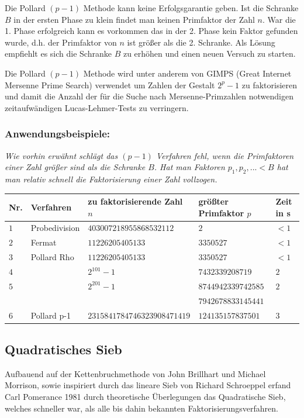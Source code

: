 \documentclass[a4paper,11pt]{article}
\begin{document}
Die Pollard $(p-1)$ Methode kann keine Erfolgsgarantie geben. Ist die Schranke $B$
in der ersten Phase zu klein findet man keinen Primfaktor der Zahl $n$. War die
1. Phase erfolgreich kann es vorkommen das in der 2. Phase kein Faktor gefunden
wurde, d.h. der Primfaktor von $n$ ist größer als die 2. Schranke. Als Lösung
empfiehlt es sich die Schranke $B$ zu erhöhen und einen neuen Versuch zu
starten.

Die Pollard $(p-1)$ Methode wird unter anderem von GIMPS (Great Internet Mersenne Prime Search) verwendet
um Zahlen der Gestalt $2^p-1$ zu faktorisieren und damit die Anzahl der für die Suche
nach Mersenne-Primzahlen notwendigen zeitaufwändigen Lucas-Lehmer-Tests zu verringern.


\subsubsection*{Anwendungsbeispiele:}
{\it
Wie vorhin erwähnt schlägt das $(p-1)$ Verfahren fehl, wenn die Primfaktoren
einer Zahl größer sind als die Schranke $B$.
Hat man Faktoren $p_1, p_2,...<B$ hat man relativ schnell die Faktorisierung einer Zahl
vollzogen.
}
\begin{center}
\begin{tabular}{|l|l|l|l|l|}
\hline
Nr. & Verfahren & zu faktorisierende Zahl $n$ & größter Primfaktor $p$ & Zeit in s\\
\hline
$1$& Probedivision & $403007218955868532112$ & $2$ & $<1$\\
\hline
$2$& Fermat & $11226205405133$ & $3350527$ & $<1$\\
\hline
$3$ & Pollard Rho & $11226205405133$ & $3350527$ & $<1$\\
$4$& & $2^{101}-1$ & $7432339208719$ & $2$\\
$5$& & $2^{201}-1$ & $8744942339742585$ & $2$\\
   & &             & $7942678833145441$ & \\
$6$ & Pollard p-1 & $2315841784746323908471419$ & $124135157837501$ & $3$\\
\hline
\end{tabular}
\end{center}


\subsection{Quadratisches Sieb}
Aufbauend auf der Kettenbruchmethode von John Brillhart und Michael Morrison,
sowie inspiriert durch das lineare Sieb von Richard Schroeppel erfand Carl Pomerance
1981 durch theoretische Überlegungen das Quadratische Sieb, welches schneller war,
als alle bis dahin bekannten Faktorisierungsverfahren.
\end{document}
